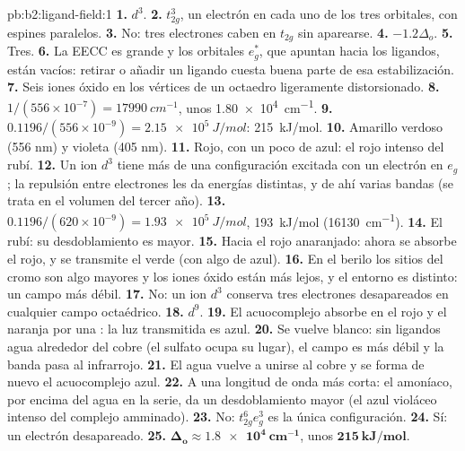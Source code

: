 \begin{solution}{pb:b2:ligand-field:1}
\textbf{1.} $d^3$.
\textbf{2.} $t_{2g}^3$, un electrón en cada uno de los tres orbitales, con espines paralelos.
\textbf{3.} No: tres electrones caben en $t_{2g}$ sin aparearse.
\textbf{4.} $-1.2\Delta_o$.
\textbf{5.} Tres.
\textbf{6.} La EECC es grande y los orbitales $e_g^*$, que apuntan hacia los ligandos, están
vacíos: retirar o añadir un ligando cuesta buena parte de esa estabilización.
\textbf{7.} Seis iones óxido en los vértices de un octaedro ligeramente distorsionado.
\textbf{8.} $1/(556 \times 10^{-7}) = \qty{17990}{cm^{-1}}$, unos \qty{1.80e4}{cm^{-1}}.
\textbf{9.} $0.1196/(556 \times 10^{-9}) = \qty{2.15e5}{J/mol}$: \qty{215}{kJ/mol}.
\textbf{10.} Amarillo verdoso (556 nm) y violeta (405 nm).
\textbf{11.} Rojo, con un poco de azul: el rojo intenso del rubí.
\textbf{12.} Un ion $d^3$ tiene más de una configuración excitada con un electrón en $e_g$;
la repulsión entre electrones les da energías distintas, y de ahí varias bandas (se trata en el
volumen del tercer año).
\textbf{13.} $0.1196/(620 \times 10^{-9}) = \qty{1.93e5}{J/mol}$, \qty{193}{kJ/mol}
(\qty{16130}{cm^{-1}}).
\textbf{14.} El rubí: su desdoblamiento es mayor.
\textbf{15.} Hacia el rojo anaranjado: ahora se absorbe el rojo, y se transmite el verde (con algo de azul).
\textbf{16.} En el berilo los sitios del cromo son algo mayores y los iones óxido están más lejos,
y el entorno es distinto: un campo más débil.
\textbf{17.} No: un ion $d^3$ conserva tres electrones desapareados en cualquier campo octaédrico.
\textbf{18.} $d^9$.
\textbf{19.} El acuocomplejo absorbe en el rojo y el naranja por una : la
luz transmitida es azul.
\textbf{20.} Se vuelve blanco: sin ligandos agua alrededor del cobre (el sulfato ocupa su
lugar), el campo es más débil y la banda pasa al infrarrojo.
\textbf{21.} El agua vuelve a unirse al cobre y se forma de nuevo el acuocomplejo azul.
\textbf{22.} A una longitud de onda más corta: el amoníaco, por encima del agua en la serie, da un
desdoblamiento mayor (el azul violáceo intenso del complejo amminado).
\textbf{23.} No: $t_{2g}^6e_g^3$ es la única configuración.
\textbf{24.} Sí: un electrón desapareado.
\textbf{25.} $\boldsymbol{\Delta_o \approx \qty{1.8e4}{cm^{-1}}}$, unos
$\boldsymbol{\qty{215}{kJ/mol}}$.
\end{solution}

